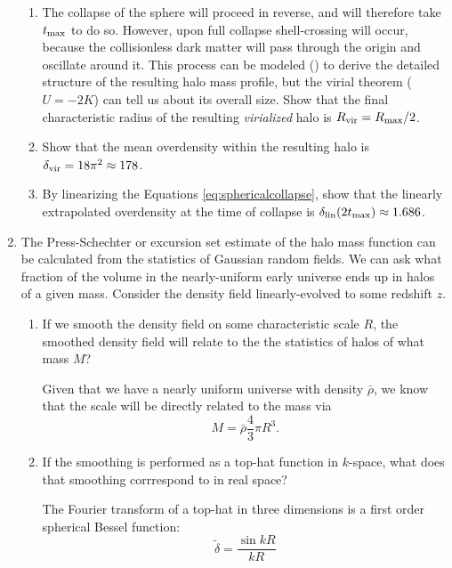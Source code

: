 \begin{enumerate}
\begin{enumerate}
\item The collapse of the sphere will proceed in reverse, and will
therefore take $t_{\rm max}$ to do so. However, upon full collapse
shell-crossing will occur, because the collisionless dark matter will
pass through the origin and oscillate around it. This process can be
modeled (\citealt{bertschinger85a, lithwick11a}) to derive the detailed
structure of the resulting halo mass profile, but the virial theorem
($U=-2K$) can tell us about its overall size. Show that the final
characteristic radius of the resulting {\it virialized} halo is
$R_{\rm vir} = R_{\rm max} / 2$.
\item Show that the mean overdensity within the resulting halo  is
$\delta_{\rm vir} = 18\pi^2 \approx 178$. 
\item By linearizing the Equations \ref{eq:sphericalcollapse}, show
that the linearly extrapolated overdensity at the time of collapse is
$\delta_{\rm lin}(2 t_{\rm max}) \approx 1.686$.
\end{enumerate}
\item The Press-Schechter or excursion set estimate of the halo mass
function can be calculated from the statistics of Gaussian random
fields. We can ask what fraction of the volume in the nearly-uniform
early universe ends up in halos of a given mass.  Consider the density
field linearly-evolved to some redshift $z$.
\begin{enumerate}
\item If we smooth the density field on some characteristic scale $R$,
the smoothed density field will relate to the the statistics of halos
of what mass $M$?
\begin{answer}
    Given that we have a nearly uniform universe with density $\bar{\rho}$, we know that the scale will be directly related to the mass via 
    \begin{equation}
        M=\bar{\rho} \frac{4}{3}\pi R^3.
    \end{equation}
\end{answer}
\item If the smoothing is performed as a top-hat function in
$k$-space, what does that smoothing corrrespond to in real space?
\begin{answer}
    The Fourier transform of a top-hat in three dimensions is a first order spherical Bessel function:
\begin{equation}
\tilde \delta = \frac{\sin k R}{kR}
\end{equation}
\end{answer}

\end{enumerate}
\end{enumerate}
